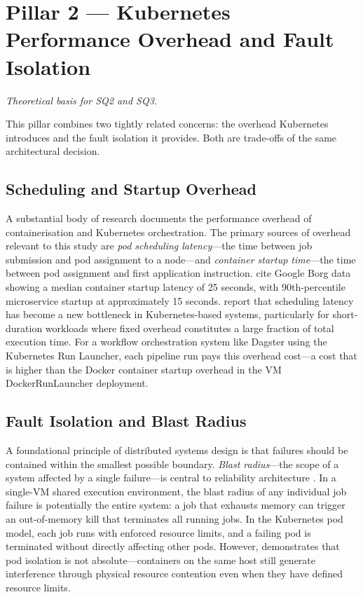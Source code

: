 
\section{Pillar 2 --- Kubernetes Performance Overhead and Fault Isolation}
\label{sec:pillar2}

\emph{Theoretical basis for SQ2 and SQ3.}

This pillar combines two tightly related concerns: the overhead Kubernetes introduces and the fault isolation it provides. Both are trade-offs of the same architectural decision.

\subsection{Scheduling and Startup Overhead}
\label{subsec:scheduling-overhead}

A substantial body of research documents the performance overhead of containerisation and Kubernetes orchestration. The primary sources of overhead relevant to this study are \emph{pod scheduling latency}---the time between job submission and pod assignment to a node---and \emph{container startup time}---the time between pod assignment and first application instruction. \citet{choi2021} cite Google Borg data showing a median container startup latency of 25 seconds, with 90th-percentile microservice startup at approximately 15 seconds. \citet{liu2024} report that scheduling latency has become a new bottleneck in Kubernetes-based systems, particularly for short-duration workloads where fixed overhead constitutes a large fraction of total execution time. For a workflow orchestration system like Dagster using the Kubernetes Run Launcher, each pipeline run pays this overhead cost---a cost that is higher than the Docker container startup overhead in the VM DockerRunLauncher deployment.

\subsection{Fault Isolation and Blast Radius}
\label{subsec:fault-isolation}

A foundational principle of distributed systems design is that failures should be contained within the smallest possible boundary. \emph{Blast radius}---the scope of a system affected by a single failure---is central to reliability architecture \citep{cilic2023}. In a single-VM shared execution environment, the blast radius of any individual job failure is potentially the entire system: a job that exhausts memory can trigger an out-of-memory kill that terminates all running jobs. In the Kubernetes pod model, each job runs with enforced resource limits, and a failing pod is terminated without directly affecting other pods. However, \citet{casalicchio2019} demonstrates that pod isolation is not absolute---containers on the same host still generate interference through physical resource contention even when they have defined resource limits.

